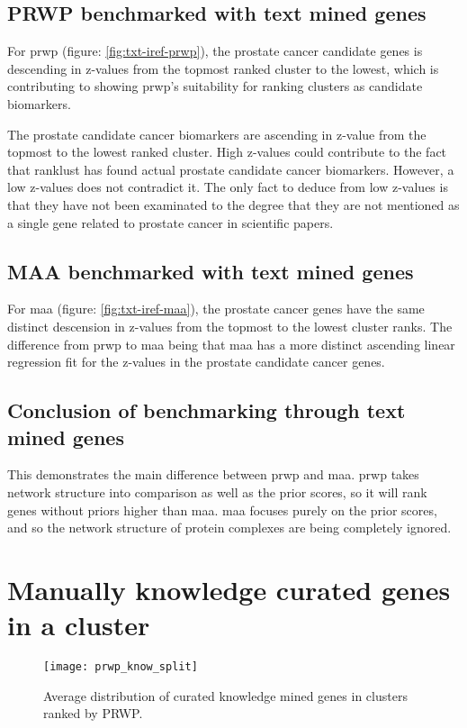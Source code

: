 \subsection{PRWP benchmarked with text mined genes}
For \gls{prwp} (figure: \ref{fig:txt-iref-prwp}), the prostate cancer candidate genes is
descending in z-values from the topmost ranked cluster to the lowest, which is
contributing to showing \gls{prwp}'s suitability for ranking clusters as
candidate biomarkers.

The prostate candidate cancer biomarkers are ascending in z-value from the
topmost to the lowest ranked cluster. High z-values could contribute to the fact
that ranklust has found actual prostate candidate cancer biomarkers. However,
a low z-values does not contradict it. The only fact to deduce from low z-values
is that they have not been examinated to the degree that they are not mentioned
as a single gene related to prostate cancer in scientific papers.

\subsection{MAA benchmarked with text mined genes}
For \gls{maa} (figure: \ref{fig:txt-iref-maa}), the prostate cancer genes have the same
distinct descension in z-values from the topmost to the lowest cluster ranks.
The difference from \gls{prwp} to \gls{maa} being that \gls{maa} has a more
distinct ascending linear regression fit for the z-values in the prostate
candidate cancer genes.

\subsection{Conclusion of benchmarking through text mined genes}
This demonstrates the main difference between \gls{prwp} and \gls{maa}.
\gls{prwp} takes network structure into comparison as well as the prior scores,
so it will rank genes without priors higher than \gls{maa}. \gls{maa} focuses
purely on the prior scores, and so the network structure of protein complexes
are being completely ignored.

\section{Manually knowledge curated genes in a cluster}
\begin{sidewaysfigure}
    \texttt{[image: prwp\_know\_split]}
    \caption{Average distribution of curated knowledge mined genes in clusters
    ranked by PRWP.}
    \label{fig:know-iref-prwp}
\end{sidewaysfigure}

